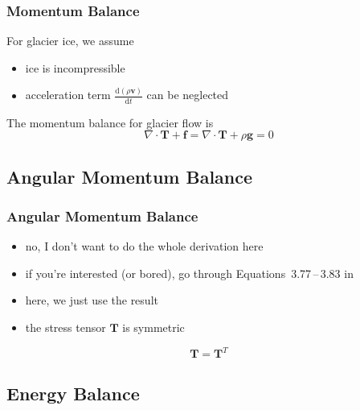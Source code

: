 \documentclass[hide notes,intlimits]{beamer}
\begin{document}
\begin{frame}
  \frametitle{Momentum Balance}
  For glacier ice, we assume
  \begin{itemize}
  \item ice is incompressible
  \item acceleration term $\frac{\text{d}\left(\rho\mathbf{v}\right)}{\text{d} t}$ can be neglected
  \end{itemize}
  \vspace{1em}
  The momentum balance for glacier flow is
  \begin{equation}
    \nabla \cdot \mathbf{T} + \mathbf{f} = \nabla \cdot \mathbf{T} + \rho \mathbf{g} = 0
  \end{equation}
\end{frame}

\subsection{Angular Momentum Balance}

\begin{frame}
  \frametitle{Angular Momentum Balance}
  \begin{itemize}
  \item  no, I don't want to do the whole derivation here
  \item if you're interested (or bored), go through Equations~3.77\,--\,3.83  in \cite{GreveBlatter_disg}
  \item here, we just use the result
  \item the stress tensor $\mathbf{T}$ is \alert{symmetric}
  \end{itemize}
  \begin{equation}
    \mathbf{T} = \mathbf{T}^{T}
 \end{equation}
\end{frame}


\subsection{Energy Balance}
\end{document}
